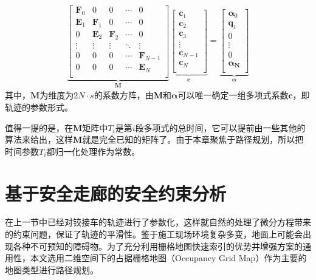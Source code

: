 \documentclass[master,academic]{ysuthesis} %
\begin{document}
		\begin{equation}
			\begin{aligned}
				\underbrace{\begin{bmatrix}
					\bm{F}_0&		0&		0&		\cdots&		0\\
					\bm{E}_1&		\bm{F}_1&		0&		\cdots&		0\\
					0&		\bm{E}_2&		\bm{F}_2&		\cdots&		0\\
					\vdots&		\vdots&		\vdots&		\ddots&		\vdots\\
					0&		0&		0&		\cdots&		\bm{F}_{N-1}\\
					0&		0&		0&		\cdots&		\bm{E}_N\\
				\end{bmatrix}}_{\bm{M}}
				\underbrace{ \begin{bmatrix}
					\bm{c}_1\\
					\bm{c}_2\\
					\bm{c}_3\\
					\vdots\\
					\bm{c}_{N-1}\\
					\bm{c}_N\\
				\end{bmatrix}}_{\bm{c}} =
				\underbrace{\begin{bmatrix}
					\bm{\alpha}_0\\
					\bm{q}_1\\
					0\\
					\vdots\\
					0\\
					\bm{\alpha_N}\\
				\end{bmatrix}}_{\bm{\alpha}} 
			\end{aligned}
			\label{eq:minco参数化}
		\end{equation}
		其中，$\bm{M}$为维度为$2N\cdot s$的系数方阵，由$\bm{M}$和$\bm{\alpha}$可以唯一确定一组多项式系数$\bm{c}$，即轨迹的参数形式。

		值得一提的是，在$\bm{M}$矩阵中$T_i$是第$i$段多项式的总时间，它可以提前由一些其他的算法来给出，这样$\bm{M}$就是完全已知的矩阵了。由于本章聚焦于路径规划，所以把时间参数$T_i$都归一化处理作为常数。
	
	\section{基于安全走廊的安全约束分析}
	在上一节中已经对铰接车的轨迹进行了参数化，这样就自然的处理了微分方程带来的约束问题，保证了轨迹的平滑性。鉴于施工现场环境复杂多变，地面上可能会出现各种不可预知的障碍物。为了充分利用栅格地图快速索引的优势并增强方案的通用性，本文选用二维空间下的占据栅格地图（Occupancy Grid Map）作为主要的地图类型进行路径规划。
	
\end{document}
